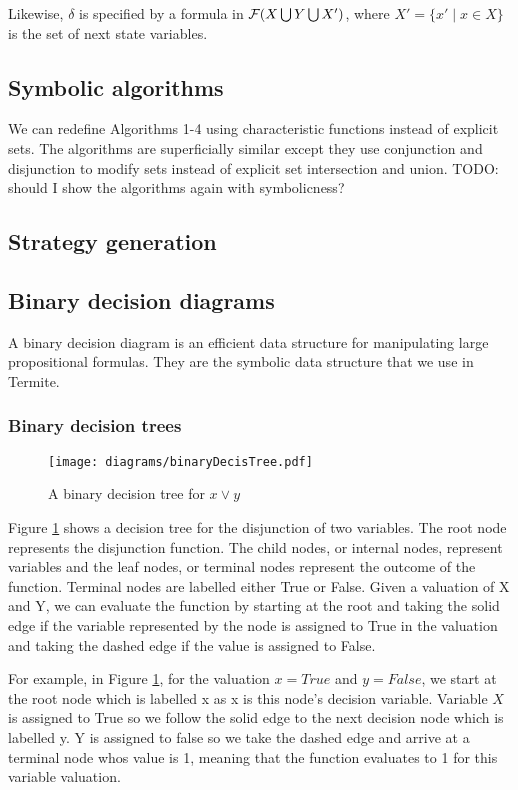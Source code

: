 Likewise, $\delta$ is specified by a formula in $\mathcal{F}(X \bigcup Y \bigcup X')$, where $X' = \{x' \mid x \in X \}$ is the set of next state variables.

\subsection{Symbolic algorithms}

We can redefine Algorithms 1-4 using characteristic functions instead of explicit sets. The algorithms are superficially similar except they use conjunction and disjunction to modify sets instead of explicit set intersection and union. TODO: should I show the algorithms again with symbolicness?

\subsection{Strategy generation}
\subsection{Binary decision diagrams}

A binary decision diagram is an efficient data structure for manipulating large propositional formulas. They are the symbolic data structure that we use in Termite.

\subsubsection{Binary decision trees}

\begin{figure}[t]
\centering
\texttt{[image: diagrams/binaryDecisTree.pdf]}
\caption{A binary decision tree for $x \vee y$}
\label{fig:decis_tree}
\end{figure}

Figure \ref{fig:decis_tree} shows a decision tree for the disjunction of two variables. The root node represents the disjunction function. The child nodes, or internal nodes, represent variables and the leaf nodes, or terminal nodes represent the outcome of the function. Terminal nodes are labelled either True or False. Given a valuation of X and Y, we can evaluate the function by starting at the root and taking the solid edge if the variable represented by the node is assigned to True in the valuation and taking the dashed edge if the value is assigned to False. 

For example, in Figure \ref{fig:decis_tree}, for the valuation $x=True$ and $y=False$, we start at the root node which is labelled x as x is this node's decision variable. Variable $X$ is assigned to True so we follow the solid edge to the next decision node which is labelled y. Y is assigned to false so we take the dashed edge and arrive at a terminal node whos value is 1, meaning that the function evaluates to 1 for this variable valuation.

